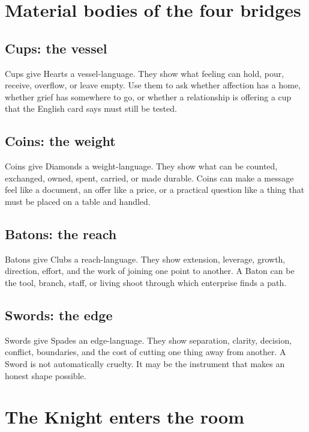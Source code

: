 \section{Material bodies of the four bridges}

\subsection{Cups: the vessel}

Cups give Hearts a vessel-language. They show what feeling can hold, pour,
receive, overflow, or leave empty. Use them to ask whether affection has a home,
whether grief has somewhere to go, or whether a relationship is offering a cup
that the English card says must still be tested.

\subsection{Coins: the weight}

Coins give Diamonds a weight-language. They show what can be counted, exchanged,
owned, spent, carried, or made durable. Coins can make a message feel like a
document, an offer like a price, or a practical question like a thing that must
be placed on a table and handled.

\subsection{Batons: the reach}

Batons give Clubs a reach-language. They show extension, leverage, growth,
direction, effort, and the work of joining one point to another. A Baton can be
the tool, branch, staff, or living shoot through which enterprise finds a path.

\subsection{Swords: the edge}

Swords give Spades an edge-language. They show separation, clarity, decision,
conflict, boundaries, and the cost of cutting one thing away from another. A
Sword is not automatically cruelty. It may be the instrument that makes an
honest shape possible.

\section{The Knight enters the room}

